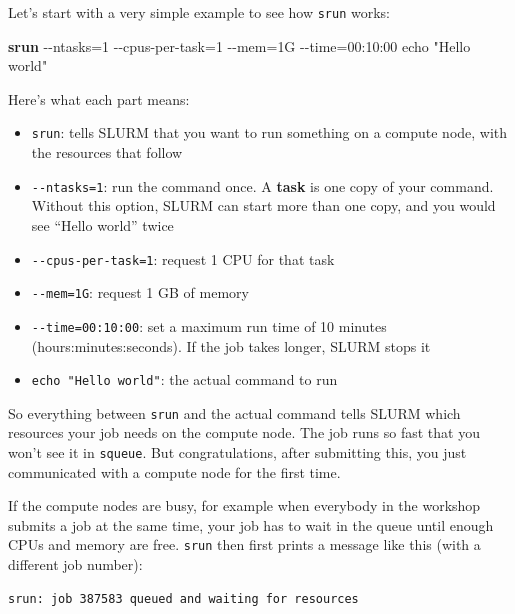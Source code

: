 \documentclass[
  letterpaper,
  DIV=11,
  numbers=noendperiod]{scrreprt}
\newenvironment{Shaded}{}{}
\newcommand{\AttributeTok}[1]{\textcolor[rgb]{0.84,0.23,0.29}{#1}}
\newcommand{\ExtensionTok}[1]{\textcolor[rgb]{0.84,0.23,0.29}{\textbf{#1}}}
\newcommand{\NormalTok}[1]{\textcolor[rgb]{0.14,0.16,0.18}{#1}}
\newcommand{\OperatorTok}[1]{\textcolor[rgb]{0.14,0.16,0.18}{#1}}
\newcommand{\StringTok}[1]{\textcolor[rgb]{0.01,0.18,0.38}{#1}}
\providecommand{\tightlist}{%
  \setlength{\itemsep}{0pt}\setlength{\parskip}{0pt}}
\begin{document}
Let's start with a very simple example to see how \texttt{srun} works:

\begin{Shaded}
\begin{Highlighting}[]
\ExtensionTok{srun} \AttributeTok{{-}{-}ntasks}\OperatorTok{=}\NormalTok{1 }\AttributeTok{{-}{-}cpus{-}per{-}task}\OperatorTok{=}\NormalTok{1 }\AttributeTok{{-}{-}mem}\OperatorTok{=}\NormalTok{1G }\AttributeTok{{-}{-}time}\OperatorTok{=}\NormalTok{00:10:00 echo }\StringTok{"Hello world"}
\end{Highlighting}
\end{Shaded}

Here's what each part means:

\begin{itemize}
\tightlist
\item
  \texttt{srun}: tells SLURM that you want to run something on a compute
  node, with the resources that follow
\item
  \texttt{-\/-ntasks=1}: run the command once. A \textbf{task} is one
  copy of your command. Without this option, SLURM can start more than
  one copy, and you would see ``Hello world'' twice
\item
  \texttt{-\/-cpus-per-task=1}: request 1 CPU for that task
\item
  \texttt{-\/-mem=1G}: request 1 GB of memory
\item
  \texttt{-\/-time=00:10:00}: set a maximum run time of 10 minutes
  (hours:minutes:seconds). If the job takes longer, SLURM stops it
\item
  \texttt{echo\ "Hello\ world"}: the actual command to run
\end{itemize}

So everything between \texttt{srun} and the actual command tells SLURM
which resources your job needs on the compute node. The job runs so fast
that you won't see it in \texttt{squeue}. But congratulations, after
submitting this, you just communicated with a compute node for the first
time.

If the compute nodes are busy, for example when everybody in the
workshop submits a job at the same time, your job has to wait in the
queue until enough CPUs and memory are free. \texttt{srun} then first
prints a message like this (with a different job number):

\begin{verbatim}
srun: job 387583 queued and waiting for resources
\end{verbatim}
\end{document}

